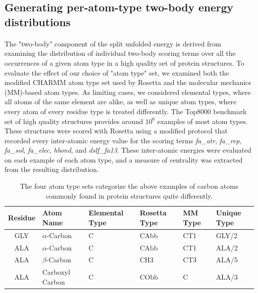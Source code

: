 \subsection{Generating per-atom-type two-body energy distributions}
\paragraph{}
The "two-body" component of the split unfolded energy is derived from examining the distribution of individual two-body scoring terms over all the occurrences of a given atom type in a high quality set of protein structures.
To evaluate the effect of our choice of "atom type" set, we examined both the modified CHARMM atom type set used by Rosetta\cite{leaver-fay_chapter_2011,bernard_charmm_1983} and the molecular mechanics (MM)-based atom types\cite{renfrew_incorporation_2012}. %
As limiting cases, we considered elemental types, where all atoms of the same element are alike, as well as unique atom types, where every atom of every residue type is treated differently.
The Top8000 benchmark set of high quality structures\cite{lovell_structure_2003} provides around $10^6$ examples of most atom types. These structures were scored with Rosetta using a modified protocol that recorded every inter-atomic energy value for the scoring terms \textit{fa\_atr}, \textit{fa\_rep}, \textit{fa\_sol}, \textit{fa\_elec}, \textit{hbond}, and \textit{dslf\_fa13}.
These inter-atomic energies were evaluated on each example of each atom type, and a measure of centrality was extracted from the resulting distribution.

\begin{table}
  \centering
  \caption{The four atom type sets categorize the above examples of carbon atoms commonly found in protein structures quite differently.}
  \label{tab:atypes_example}
  \begin{tabular}{clllll}
    \toprule
    Residue & Atom Name & Elemental Type & Rosetta Type & MM Type & Unique Type\\
    \midrule
    GLY & $\alpha$-Carbon & C & CAbb & CT1 & GLY/2\\
    ALA & $\alpha$-Carbon & C & CAbb & CT1 & ALA/2\\
    ALA & $\beta$-Carbon & C & CH3 & CT3 & ALA/5\\
    ALA & Carboxyl Carbon & C & CObb & C & ALA/3\\
    \bottomrule
  \end{tabular}
\end{table}

